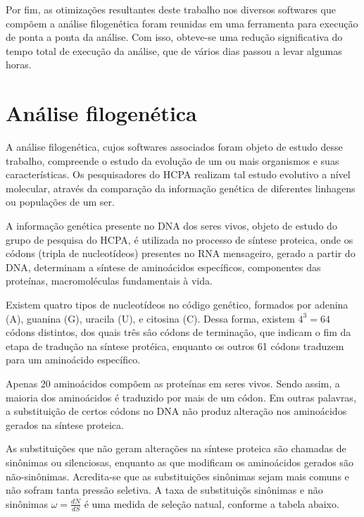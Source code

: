 \documentclass[cic,tc]{iiufrgs}
\begin{document}
Por fim, as otimizações resultantes deste trabalho nos diversos softwares que
compõem a análise filogenética foram reunidas em uma ferramenta para execução
de ponta a ponta da análise. Com isso, obteve-se uma redução significativa do
tempo total de execução da análise, que de vários dias passou a levar algumas
horas.

\section{Análise filogenética}

A análise filogenética, cujos softwares associados foram objeto de estudo desse
trabalho, compreende o estudo da evolução de um ou mais organismos e suas
características. Os pesquisadores do HCPA realizam tal estudo evolutivo a nível
molecular, através da comparação da informação genética de diferentes linhagens
ou populações de um ser.

A informação genética presente no DNA dos seres vivos, objeto de estudo do
grupo de pesquisa do HCPA, é utilizada no processo de síntese proteica, onde os
códons (tripla de nucleotídeos) presentes no RNA mensageiro, gerado a partir do
DNA, determinam a síntese de aminoácidos específicos, componentes das
proteínas, macromoléculas fundamentais à vida.

Existem quatro tipos de nucleotídeos no código genético, formados por adenina
(A), guanina (G), uracila (U), e citosina (C). Dessa forma, existem $4^3 = 64$
códons distintos, dos quais três sâo códons de terminação, que indicam o fim da
etapa de tradução na síntese protéica, enquanto os outros 61 códons traduzem
para um aminoácido específico.

Apenas 20 aminoácidos compõem as proteínas em seres vivos. Sendo assim, a
maioria dos aminoácidos é traduzido por mais de um códon. Em outras palavras, a
substituição de certos códons no DNA não produz alteração nos aminoácidos
gerados na síntese proteica.

As substituições que não geram alterações na síntese proteica são chamadas de
sinônimas ou silenciosas, enquanto as que modificam os aminoácidos gerados são
não-sinônimas. Acredita-se que as substituições sinônimas sejam mais comuns e
não sofram tanta pressão seletiva. A taxa de substituiçõs sinônimas e não
sinônimas $\omega = \frac{dN}{dS}$ é uma medida de seleção natual, conforme a
tabela abaixo.\cite{yang2002codon}
\end{document}
